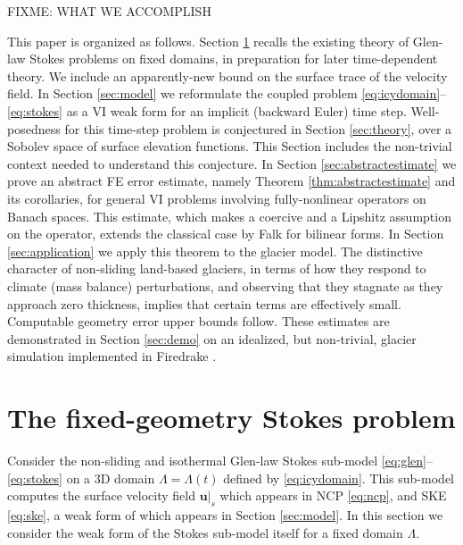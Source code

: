 \documentclass[hidelinks,onefignum,onetabnum,final]{siamart220329}  %
\newcommand{\bu}{\mathbf{u}}
\begin{document}
FIXME: WHAT WE ACCOMPLISH

This paper is organized as follows.  Section \ref{sec:stokes} recalls the existing theory of Glen-law Stokes problems on fixed domains, in preparation for later time-dependent theory.  We include an apparently-new bound on the surface trace of the velocity field.  In Section \ref{sec:model} we reformulate the coupled problem \eqref{eq:icydomain}--\eqref{eq:stokes} as a VI weak form for an implicit (backward Euler) time step.  Well-posedness for this time-step problem is conjectured in Section \ref{sec:theory}, over a Sobolev space of surface elevation functions.  This Section includes the non-trivial context needed to understand this conjecture.  In Section \ref{sec:abstractestimate} we prove an abstract FE error estimate, namely Theorem \ref{thm:abstractestimate} and its corollaries, for general VI problems involving fully-nonlinear operators on Banach spaces.  This estimate, which makes a coercive and a Lipshitz assumption on the operator, extends the classical case by Falk \cite{Falk1974} for bilinear forms.  In Section \ref{sec:application} we apply this theorem to the glacier model.  The distinctive character of non-sliding land-based glaciers, in terms of how they respond to climate (mass balance) perturbations, and observing that they stagnate as they approach zero thickness, implies that certain terms are effectively small.  Computable geometry error upper bounds follow.  These estimates are demonstrated in Section \ref{sec:demo} on an idealized, but non-trivial, glacier simulation implemented in Firedrake \cite{Hametal2023}.


\section{The fixed-geometry Stokes problem} \label{sec:stokes}

Consider the non-sliding and isothermal Glen-law Stokes sub-model \eqref{eq:glen}--\eqref{eq:stokes} on a 3D domain $\Lambda = \Lambda(t)$ defined by \eqref{eq:icydomain}.  This sub-model computes the surface velocity field $\bu|_s$ which appears in NCP \eqref{eq:ncp}, and SKE \eqref{eq:ske}, a weak form of which appears in Section \ref{sec:model}.  In this section we consider the weak form of the Stokes sub-model itself for a fixed domain $\Lambda$.
\end{document}
